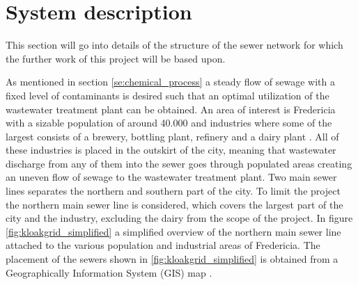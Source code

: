 \chapter{System description}\label{se:system_description}
This section will go into details of the structure of the sewer network for which the further work of this project will be based upon.

As mentioned in section \ref{se:chemical_process} a steady flow of sewage with a fixed level of contaminants is desired such that an optimal utilization of the wastewater treatment plant can be obtained. An area of interest is Fredericia with a sizable population of around 40.000 and industries where some of the largest consists of a brewery, bottling plant, refinery and a dairy plant \citep{Statistic_Denmark}. All of these industries is placed in the outskirt of the city, meaning that wastewater discharge from any of them into the sewer goes through populated areas creating an uneven flow of sewage to the wastewater treatment plant. Two main sewer lines separates the northern and southern part of the city. To limit the project the northern main sewer line is considered, which covers the largest part of the city and the industry, excluding the dairy from the scope of the project. In figure \ref{fig:kloakgrid_simplified} a simplified overview of the northern main sewer line attached to the various population and industrial areas of Fredericia. The placement of the sewers shown in \ref{fig:kloakgrid_simplified} is obtained from a Geographically Information System (GIS) map \cite{GIS_kort}.     

